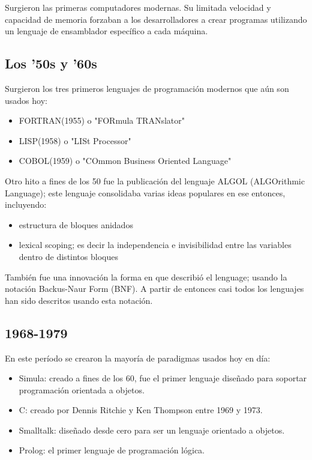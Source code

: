 \documentclass[a4paper,10pt]{article}
\begin{document}
Surgieron las primeras computadores modernas. Su limitada velocidad y capacidad de memoria forzaban a los desarrolladores a crear programas utilizando un lenguaje de ensamblador específico a cada máquina.

\subsection{Los '50s y '60s}

Surgieron los tres primeros lenguajes de programación modernos que aún son usados hoy:

\begin{itemize}
\item FORTRAN(1955) o "FORmula TRANslator"
\item LISP(1958) o "LISt Processor"
\item COBOL(1959) o "COmmon Business Oriented Language"
\end{itemize}

Otro hito a fines de los 50 fue la publicación del lenguaje ALGOL (ALGOrithmic Language); este lenguaje consolidaba varias ideas populares en ese entonces, incluyendo:

\begin{itemize}
\item estructura de bloques anidados
\item lexical scoping; es decir la independencia e invisibilidad entre las variables dentro de distintos bloques
\end{itemize}

También fue una innovación la forma en que describió el lenguage; usando la notación Backus-Naur Form (BNF). A partir de entonces casi todos los lenguajes han sido descritos usando esta notación.


\subsection{1968-1979}

En este período se crearon la mayoría de paradigmas usados hoy en día:

\begin{itemize}
\item Simula: creado a fines de los 60, fue el primer lenguaje diseñado para soportar programación orientada a objetos.
\item C: creado por Dennis Ritchie y Ken Thompson entre 1969 y 1973.
\item Smalltalk: diseñado desde cero para ser un lenguaje orientado a objetos.
\item Prolog: el primer lenguaje de programación lógica.
\end{itemize}
\end{document}
